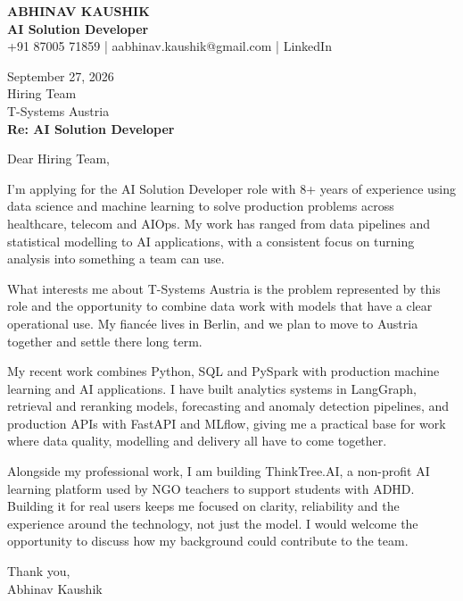 \documentclass[10pt,a4paper]{article}
\begin{document}
\begin{center}
{\Large\bfseries ABHINAV KAUSHIK}\\[2pt]
{\bfseries AI Solution Developer}\\[2pt]
+91 87005 71859 \quad | \quad aabhinav.kaushik@gmail.com \quad | \quad LinkedIn
\end{center}
\vspace{8pt}
September 27, 2026\\[6pt]
Hiring Team\\
T-Systems Austria\\[4pt]
\textbf{Re: AI Solution Developer}

Dear Hiring Team,

I’m applying for the AI Solution Developer role with 8+ years of experience using data science and machine learning to solve production problems across healthcare, telecom and AIOps. My work has ranged from data pipelines and statistical modelling to AI applications, with a consistent focus on turning analysis into something a team can use.

What interests me about T-Systems Austria is the problem represented by this role and the opportunity to combine data work with models that have a clear operational use. My fiancée lives in Berlin, and we plan to move to Austria together and settle there long term.

My recent work combines Python, SQL and PySpark with production machine learning and AI applications. I have built analytics systems in LangGraph, retrieval and reranking models, forecasting and anomaly detection pipelines, and production APIs with FastAPI and MLflow, giving me a practical base for work where data quality, modelling and delivery all have to come together.

Alongside my professional work, I am building ThinkTree.AI, a non-profit AI learning platform used by NGO teachers to support students with ADHD. Building it for real users keeps me focused on clarity, reliability and the experience around the technology, not just the model. I would welcome the opportunity to discuss how my background could contribute to the team.

Thank you,\\
Abhinav Kaushik
\end{document}
